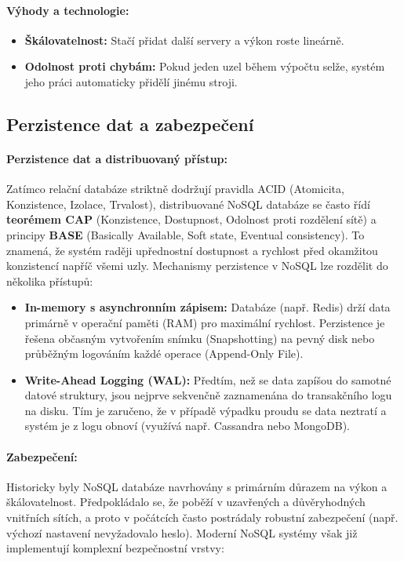 \paragraph*{Výhody a technologie:}
\begin{itemize}
    \item \textbf{Škálovatelnost:} Stačí přidat další servery a výkon roste lineárně.
    \item \textbf{Odolnost proti chybám:} Pokud jeden uzel během výpočtu selže, systém jeho práci automaticky přidělí jinému stroji.
\end{itemize}

\subsection{Perzistence dat a zabezpečení}


\paragraph*{Perzistence dat a distribuovaný přístup:}
Zatímco relační databáze striktně dodržují pravidla ACID (Atomicita, Konzistence, Izolace, Trvalost), distribuované NoSQL databáze se často řídí \textbf{teorémem CAP} (Konzistence, Dostupnost, Odolnost proti rozdělení sítě) a principy \textbf{BASE} (Basically Available, Soft state, Eventual consistency). To znamená, že systém raději upřednostní dostupnost a rychlost před okamžitou konzistencí napříč všemi uzly.
Mechanismy perzistence v NoSQL lze rozdělit do několika přístupů:
\begin{itemize}
    \item \textbf{In-memory s asynchronním zápisem:} Databáze (např. Redis) drží data primárně v operační paměti (RAM) pro maximální rychlost. Perzistence je řešena občasným vytvořením snímku (Snapshotting) na pevný disk nebo průběžným logováním každé operace (Append-Only File).
    \item \textbf{Write-Ahead Logging (WAL):} Předtím, než se data zapíšou do samotné datové struktury, jsou nejprve sekvenčně zaznamenána do transakčního logu na disku. Tím je zaručeno, že v případě výpadku proudu se data neztratí a systém je z logu obnoví (využívá např. Cassandra nebo MongoDB).
\end{itemize}

\paragraph*{Zabezpečení:}
Historicky byly NoSQL databáze navrhovány s primárním důrazem na výkon a škálovatelnost. Předpokládalo se, že poběží v uzavřených a důvěryhodných vnitřních sítích, a proto v počátcích často postrádaly robustní zabezpečení (např. výchozí nastavení nevyžadovalo heslo). Moderní NoSQL systémy však již implementují komplexní bezpečnostní vrstvy:

